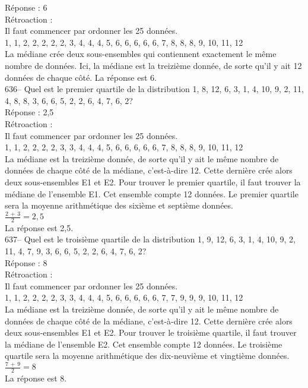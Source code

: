 ﻿\documentclass[letterpaper, 12pt]{article}
\begin{document}
R\'eponse : 6\\

R\'etroaction : \\
Il faut commencer par ordonner les 25 donn\'ees.\\
1, 1, 2, 2, 2, 2, 2, 3, 4, 4, 4, 5, 6, 6, 6, 6, 6, 7, 8, 8, 8, 9, 10, 11,
12\\
La m\'ediane cr\'ee deux sous-ensembles qui contiennent exactement le m\^eme
nombre de donn\'ees.  Ici, la m\'ediane est la treizi\`eme donn\'ee, de
sorte qu'il y ait 12 donn\'ees de chaque c\^ot\'e.  La r\'eponse est 6.\\

636--  Quel est le premier quartile de la distribution 1, 8, 12, 6, 3, 1, 4,
10, 9, 2, 11, 4, 8, 8, 3, 6, 6, 5, 2, 2, 6, 4, 7, 6, 2?\\

R\'eponse : 2,5\\

R\'etroaction : \\
Il faut commencer par ordonner les 25 donn\'ees.\\
1, 1, 2, 2, 2, 2, 3, 3, 4, 4, 4, 5, 6, 6, 6, 6, 6, 7, 8, 8, 8, 9, 10, 11,
12\\
La m\'ediane est la treizi\`eme donn\'ee, de sorte qu'il y ait le m\^eme
nombre de donn\'ees de chaque c\^ot\'e de la m\'ediane, c'est-\`a-dire 12.
Cette derni\`ere cr\'ee alors deux sous-ensembles E1 et E2.  Pour trouver le
premier quartile, il faut trouver la m\'ediane de l'ensemble E1.  Cet
ensemble compte 12 donn\'ees.  Le premier quartile sera la moyenne
arithm\'etique des sixi\`eme et septi\`eme donn\'ees.  \\[2mm]
$\frac{2\,+\,3}{2}=2,5$\\[2mm]
La r\'eponse est 2,5.\\

637--  Quel est le troisi\`eme quartile de la distribution 1, 9, 12, 6, 3,
1, 4, 10, 9, 2, 11, 4, 7, 9, 3, 6, 6, 5, 2, 2, 6, 4, 7, 6, 2?\\

R\'eponse : 8\\

R\'etroaction : \\
Il faut commencer par ordonner les 25 donn\'ees.\\
1, 1, 2, 2, 2, 2, 3, 3, 4, 4, 4, 5, 6, 6, 6, 6, 6, 7, 7, 9, 9, 9, 10, 11,
12\\
La m\'ediane est la treizi\`eme donn\'ee, de sorte qu'il y ait le m\^eme
nombre de donn\'ees de chaque c\^ot\'e de la m\'ediane, c'est-\`a-dire 12.
Cette derni\`ere cr\'ee alors deux sous-ensembles E1 et E2.  Pour trouver le
troisi\`eme quartile, il faut trouver la m\'ediane de l'ensemble E2.  Cet
ensemble compte 12 donn\'ees.  Le troisi\`eme quartile sera la moyenne
arithm\'etique des dix-neuvi\`eme et vingti\`eme donn\'ees.  \\[2mm]
$\frac{7\,+\,9}{2}=8$\\[2mm]
La r\'eponse est 8.\\
\end{document}
